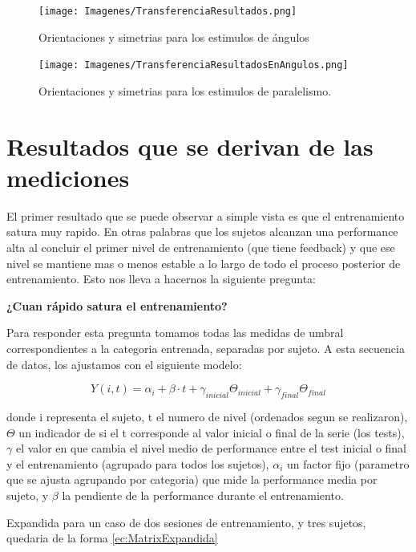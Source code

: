 \documentclass{article}
\begin{document}
    \begin{figure}
        \centering
        \texttt{[image: Imagenes/TransferenciaResultados.png]}
        \caption{Orientaciones y simetrias para los estimulos de ángulos}
        \label{fig:DatosBrutos}
    \end{figure}
    
    \begin{figure}
        \centering
        \texttt{[image: Imagenes/TransferenciaResultadosEnAngulos.png]}
        \caption{Orientaciones y simetrias para los estimulos de paralelismo.}
        \label{fig:DatosBrutosEnAngulos}
    \end{figure}

\section{Resultados que se derivan de las mediciones}

El primer resultado que se puede observar a simple vista es que el entrenamiento satura muy rapido. En otras palabras que los sujetos alcanzan una performance alta al concluir el primer nivel de entrenamiento (que tiene feedback) y que ese nivel se mantiene mas o menos estable a lo largo de todo el proceso posterior de entrenamiento. Esto nos lleva a hacernos la siguiente pregunta:

\textbf{¿Cuan rápido satura el entrenamiento?}

Para responder esta pregunta tomamos todas las medidas de umbral correspondientes a la categoria entrenada, separadas por sujeto. A esta secuencia de datos, los ajustamos con el siguiente modelo:

\begin{equation} \label{ec:RegresionEntrenamiento}
    Y(i,t) = \alpha_i + \beta \cdot t + \gamma_{inicial} \Theta_{inicial} + \gamma_{final} \Theta_{final}
\end{equation}

donde i representa el sujeto, t el numero de nivel (ordenados segun se realizaron), $\Theta$ un indicador de si el t corresponde al valor inicial o final de la serie (los tests), $\gamma$ el valor en que cambia el nivel medio de performance entre el test inicial o final y el entrenamiento (agrupado para todos los sujetos), $\alpha_{i}$ un factor fijo (parametro que se ajusta agrupando por categoria) que mide la performance media por sujeto, y $\beta$ la pendiente de la performance durante el entrenamiento.

Expandida para un caso de dos sesiones de entrenamiento, y tres sujetos, quedaria de la forma \ref{ec:MatrixExpandida}
\end{document}
